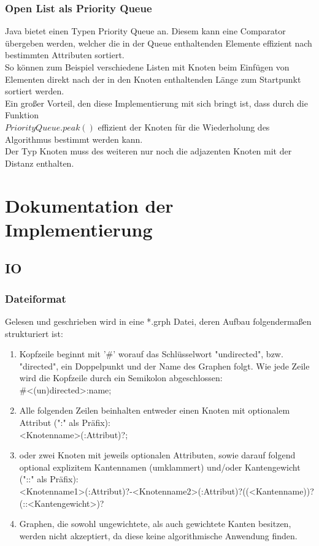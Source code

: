 \documentclass[a4paper]{article}
\begin{document}
\subsubsection{Open List als Priority Queue} \label{priorityQueueSection}

Java bietet einen Typen Priority Queue an. Diesem kann eine Comparator übergeben werden, welcher die in der Queue enthaltenden Elemente effizient nach bestimmten Attributen sortiert.\\
So können zum Beispiel verschiedene Listen mit Knoten beim Einfügen von Elementen direkt nach der in den Knoten enthaltenden Länge zum Startpunkt sortiert werden.\\
Ein großer Vorteil, den diese Implementierung mit sich bringt ist, dass durch die Funktion\\$PriorityQueue.peak()$ effizient der Knoten für die Wiederholung des Algorithmus bestimmt werden kann.\\
Der Typ Knoten muss des weiteren nur noch die adjazenten Knoten mit der Distanz enthalten.\\

\section{Dokumentation der Implementierung}

\subsection{IO}

\subsubsection{Dateiformat}
Gelesen und geschrieben wird in eine *.grph Datei, deren Aufbau folgendermaßen strukturiert ist:
\begin{enumerate}
 	\item Kopfzeile beginnt mit '\#' worauf das Schlüsselwort "undirected", bzw. "directed", ein Doppelpunkt und der Name des Graphen folgt. Wie jede Zeile wird die Kopfzeile durch ein Semikolon abgeschlossen:\\
		\#<(un)directed>:name;
	\item Alle folgenden Zeilen beinhalten entweder einen Knoten mit optionalem Attribut (":" als Präfix):\\
		<Knotenname>(:Attribut)?;\\
	\item oder zwei Knoten mit jeweils optionalen Attributen, sowie darauf folgend optional explizitem Kantennamen (umklammert) und/oder Kantengewicht ("::" als Präfix):\\
		<Knotenname1>(:Attribut)?-<Knotenname2>(:Attribut)?((<Kantenname))?(::<Kantengewicht>)?
    \item Graphen, die sowohl ungewichtete, als auch gewichtete Kanten besitzen, werden nicht akzeptiert, da diese keine algorithmische Anwendung finden.
\end{enumerate}
\end{document}
